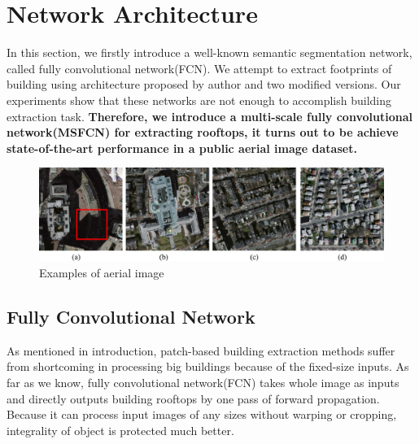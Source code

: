 \documentclass[runningheads]{llncs}
\begin{document}
\section{Network Architecture} 
    In this section, we firstly introduce a well-known semantic segmentation network, called fully convolutional network(FCN)\cite{Long2014Fully}. We attempt to extract footprints of building  using  architecture proposed by author and two modified versions. Our experiments show that these networks are not enough to accomplish building   extraction task. \textbf{Therefore, we introduce a multi-scale fully convolutional network(MSFCN) for extracting rooftops, it turns out to be achieve state-of-the-art performance in a public aerial image dataset.}
         
\begin{figure}
\centering
\label{fig:AerialImages}
\includegraphics[width=120mm]{AerialImages}
\caption{Examples of aerial image}
\end{figure}
 
\subsection{Fully Convolutional Network}
    As mentioned in introduction, patch-based building extraction methods \cite{Mnih2013Machine} \cite{Saito2016Multiple} suffer from shortcoming in processing big buildings because of the fixed-size inputs. As far as we know, fully convolutional network(FCN) takes whole image as inputs and directly outputs building rooftops by one pass of forward propagation. Because it can process input images of any sizes without warping or cropping, integrality of object is protected much better. 
	
\end{document}
